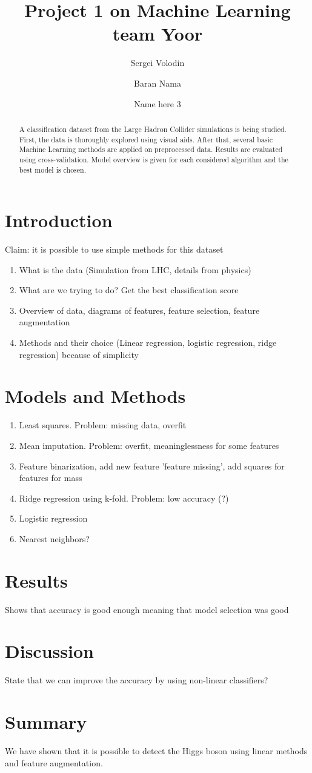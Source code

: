 \documentclass[10pt,conference,compsocconf]{IEEEtran}
\title{Project 1 on Machine Learning team Yoor}
\author[1]{Sergei Volodin}
\author[1]{Baran Nama}
\author[1]{Name here 3}
\affil[1]{EPFL}
\affil[ ]{\textit {\{sergei.volodin,baran.nama,email3\}@epfl.ch}}
\begin{document}
\maketitle

\begin{abstract}
A classification dataset from the Large Hadron Collider simulations is being studied. First, the data is thoroughly explored using visual aids.
After that, several basic Machine Learning methods are applied on preprocessed data.
Results are evaluated using cross-validation.
Model overview is given for each considered algorithm and the best model is chosen.
\end{abstract}

\section{Introduction}
Claim: it is possible to use simple methods for this dataset
\begin{enumerate}
	\item What is the data (Simulation from LHC, details from physics)
	\item What are we trying to do? Get the best classification score
	\item Overview of data, diagrams of features, feature selection, feature augmentation
	\item Methods and their choice (Linear regression, logistic regression, ridge regression) because of simplicity
\end{enumerate}
\section{Models and Methods}
\begin{enumerate}
\item Least squares. Problem: missing data, overfit
\item Mean imputation. Problem: overfit, meaninglessness for some features
\item Feature binarization, add new feature 'feature missing', add squares for features for mass
\item Ridge regression using k-fold. Problem: low accuracy (?)
\item Logistic regression
\item Nearest neighbors?
\end{enumerate}
\section{Results}
Shows that accuracy is good enough meaning that model selection was good
\section{Discussion}
State that we can improve the accuracy by using non-linear classifiers?
\section{Summary}
We have shown that it is possible to detect the Higgs boson using linear methods and feature augmentation.
\end{document}
